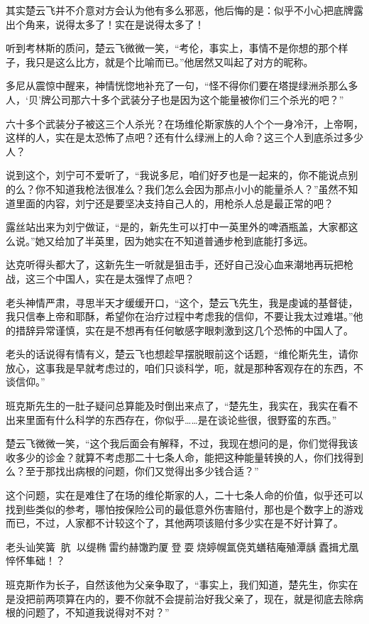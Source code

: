 其实楚云飞并不介意对方会认为他有多么邪恶，他后悔的是：似乎不小心把底牌露出个角来，说得太多了！实在是说得太多了！

听到考林斯的质问，楚云飞微微一笑，“考伦，事实上，事情不是你想的那个样子，我只是这么比方，就是个比喻而已。”他居然又叫起了对方的昵称。

多尼从震惊中醒来，神情恍惚地补充了一句，“怪不得你们要在塔提绿洲杀那么多人，‘贝’牌公司那六十多个武装分子也是因为这个能量被你们三个杀光的吧？”

六十多个武装分子被这三个人杀光？在场维伦斯家族的人个个一身冷汗，上帝啊，这样的人，实在是太恐怖了点吧？还有什么绿洲上的人命？这三个人到底杀过多少人？

说到这个，刘宁可不爱听了，“我说多尼，咱们好歹也是一起来的，你不能说点别的么？你不知道我枪法很准么？我们怎么会因为那点小小的能量杀人？”虽然不知道里面的内容，刘宁还是要坚决支持自己人的，用枪杀人总是最正常的吧？

露丝站出来为刘宁做证，“是的，新先生可以打中一英里外的啤酒瓶盖，大家都这么说。”她又给加了半英里，因为她实在不知道普通步枪到底能打多远。

达克听得头都大了，这新先生一听就是狙击手，还好自己没心血来潮地再玩把枪战，这三个中国人，实在是太强悍了点吧？

老头神情严肃，寻思半天才缓缓开口，“这个，楚云飞先生，我是虔诚的基督徒，我只信奉上帝和耶酥，希望你在治疗过程中考虑我的信仰，不要让我太过难堪。”他的措辞异常谨慎，实在是不想再有任何敏感字眼刺激到这几个恐怖的中国人了。

老头的话说得有情有义，楚云飞也想趁早摆脱眼前这个话题，“维伦斯先生，请你放心，这事我是早就考虑过的，咱们只谈科学，呃，就是那种客观存在的东西，不谈信仰。”

班克斯先生的一肚子疑问总算能及时倒出来点了，“楚先生，我实在，我实在看不出来里面有什么科学的东西存在，你似乎……是在谈论些很，很野蛮的东西。”

楚云飞微微一笑，“这个我后面会有解释，不过，我现在想问的是，你们觉得我该收多少的诊金？就算不考虑那二十七条人命，能把这种能量转换的人，你们找得到么？至于那找出病根的问题，你们又觉得出多少钱合适？”

这个问题，实在是难住了在场的维伦斯家的人，二十七条人命的价值，似乎还可以找到些类似的参考，哪怕按保险公司的最低意外伤害赔付，那也是个数字上的游戏而已，不过，人家都不计较这个了，其他两项该赔付多少实在是不好计算了。

老头讪笑簧肮以缇椭雷约赫馓趵厦登耍烧婷幌氲侥芄蟮秸庵殖潭龋蠹揖尤凰悴怀隼础！？

班克斯作为长子，自然该他为父亲争取了，“事实上，我们知道，楚先生，你实在是没把前两项算在内的，要不你就不会提前治好我父亲了，现在，就是彻底去除病根的问题了，不知道我说得对不对？”

